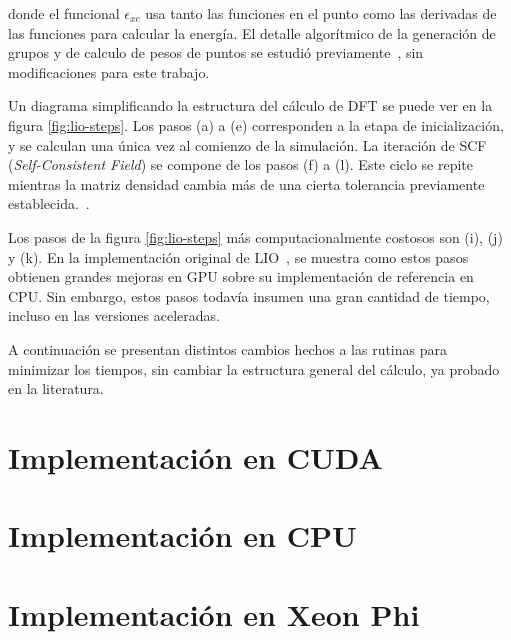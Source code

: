 donde el funcional $\epsilon_{xc}$ usa tanto las funciones en el punto como las derivadas de las funciones para
calcular la energ\'ia. El detalle algor\'itmico de la generaci\'on de grupos y de calculo de pesos de puntos
se estudi\'o previamente~\cite{Nitsche2014,TesisNitsche}, sin modificaciones para este trabajo.

Un diagrama simplificando la estructura del c\'alculo de DFT se puede ver en la figura \ref{fig:lio-steps}.
Los pasos (a) a (e) corresponden a la etapa de inicializaci\'on, y se calculan una \'unica vez
al comienzo de la simulaci\'on. La iteraci\'on de SCF (\textit{Self-Consistent Field}) se
compone de los pasos (f) a (l). Este ciclo se repite mientras la matriz densidad cambia
m\'as de una cierta tolerancia previamente establecida.~\cite{Nitsche2014}.

Los pasos de la figura \ref{fig:lio-steps} m\'as computacionalmente costosos son (i), (j) y (k).
En la implementaci\'on original de LIO~\cite{TesisNitsche}, se muestra como estos pasos
obtienen grandes mejoras en GPU sobre su implementaci\'on de referencia en CPU. Sin embargo,
estos pasos todav\'ia insumen una gran cantidad de tiempo, incluso en las versiones aceleradas.

A continuaci\'on se presentan distintos cambios hechos a las rutinas para minimizar los tiempos,
sin cambiar la estructura general del c\'alculo, ya probado en la literatura.

\section{Implementaci\'on en CUDA}



\section{Implementaci\'on en CPU}



\section{Implementaci\'on en Xeon Phi}



